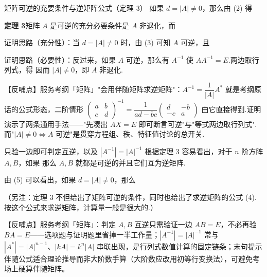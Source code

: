 \begin{fdeep}{矩阵可逆的充要条件与逆矩阵公式（定理 3）}
如果 $d=|A|\ne 0$，那么由 (2) 得

\textbf{定理 3}\quad 矩阵 $A$ 是可逆的充分必要条件是 $A$ 非退化，而

证明思路（充分性）：当 $d=|A|\ne 0$ 时，由 (3) 可知 $A$ 可逆，且

证明思路（必要性）：反过来，如果 $A$ 可逆，那么有 $A^{-1}$ 使 $AA^{-1}=E$.两边取行列式，得
因而 $|A|\ne 0$，即 $A$ 非退化.

【反哺点】服务考纲「矩阵」"会用伴随矩阵求逆矩阵"：$A^{-1}=\dfrac{1}{|A|}A^{*}$ 就是考纲原话的公式形态，二阶情形 $\begin{pmatrix}a&b\\c&d\end{pmatrix}^{-1}=\dfrac{1}{ad-bc}\begin{pmatrix}d&-b\\-c&a\end{pmatrix}$ 由它直接得到.证明演示了两条通用手法——"先凑出 $AX=E$ 即可断言可逆"与"等式两边取行列式".而"$|A|\ne0\Leftrightarrow A$ 可逆"是贯穿方程组、秩、特征值讨论的总开关.
\end{fdeep}

\begin{fdeep}{只验一边即可判定互逆，以及 $|A^{-1}|=|A|^{-1}$}
根据定理 3 容易看出，对于 $n$ 阶方阵 $A,B$，如果
那么 $A,B$ 就都是可逆的并且它们互为逆矩阵.

由 (5) 可以看出，如果 $d=|A|\ne 0$，那么

（另注：定理 3 不但给出了矩阵可逆的条件，同时也给出了求逆矩阵的公式 (4).按这个公式来求逆矩阵，计算量一般是很大的.）

【反哺点】服务考纲「矩阵」：判定 $A,B$ 互逆只需验证一边 $AB=E$，不必再验 $BA=E$——选项题与证明题里省掉一半工作量；$|A^{-1}|=|A|^{-1}$ 常与 $|A^{*}|=|A|^{n-1}$、$|kA|=k^{n}|A|$ 串联出现，是行列式数值计算的固定链条；末句提示伴随公式适合理论推导而非大阶数手算（大阶数应改用初等行变换法），可避免考场上硬算伴随矩阵。
\end{fdeep}

